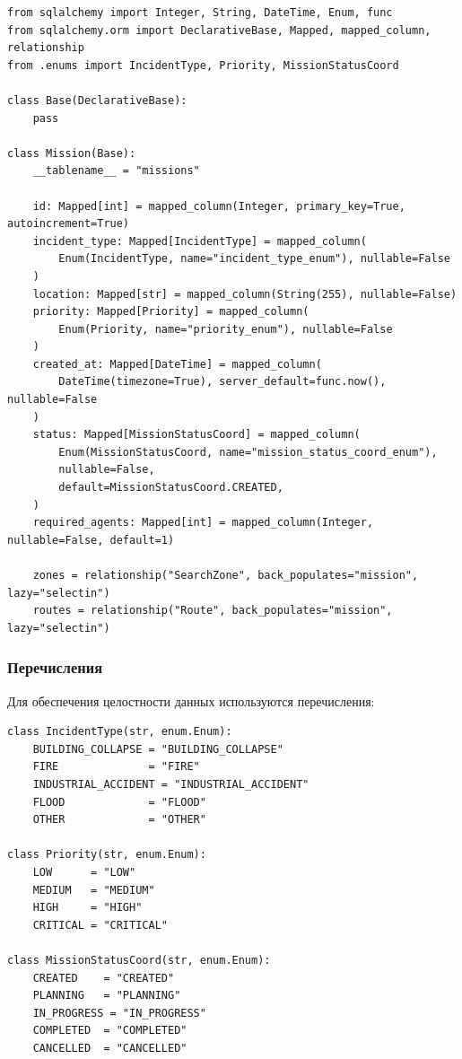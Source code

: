\documentclass[12pt,a4paper]{article}
\begin{document}
\begin{lstlisting}[caption={Модель миссии (coordination\_service/app/models/mission.py)}]
from sqlalchemy import Integer, String, DateTime, Enum, func
from sqlalchemy.orm import DeclarativeBase, Mapped, mapped_column, relationship
from .enums import IncidentType, Priority, MissionStatusCoord

class Base(DeclarativeBase):
    pass

class Mission(Base):
    __tablename__ = "missions"

    id: Mapped[int] = mapped_column(Integer, primary_key=True, autoincrement=True)
    incident_type: Mapped[IncidentType] = mapped_column(
        Enum(IncidentType, name="incident_type_enum"), nullable=False
    )
    location: Mapped[str] = mapped_column(String(255), nullable=False)
    priority: Mapped[Priority] = mapped_column(
        Enum(Priority, name="priority_enum"), nullable=False
    )
    created_at: Mapped[DateTime] = mapped_column(
        DateTime(timezone=True), server_default=func.now(), nullable=False
    )
    status: Mapped[MissionStatusCoord] = mapped_column(
        Enum(MissionStatusCoord, name="mission_status_coord_enum"),
        nullable=False,
        default=MissionStatusCoord.CREATED,
    )
    required_agents: Mapped[int] = mapped_column(Integer, nullable=False, default=1)

    zones = relationship("SearchZone", back_populates="mission", lazy="selectin")
    routes = relationship("Route", back_populates="mission", lazy="selectin")
\end{lstlisting}

\subsubsection{Перечисления}

Для обеспечения целостности данных используются перечисления:

\begin{lstlisting}[caption={Перечисления coordination\_service}]
class IncidentType(str, enum.Enum):
    BUILDING_COLLAPSE = "BUILDING_COLLAPSE"
    FIRE              = "FIRE"
    INDUSTRIAL_ACCIDENT = "INDUSTRIAL_ACCIDENT"
    FLOOD             = "FLOOD"
    OTHER             = "OTHER"

class Priority(str, enum.Enum):
    LOW      = "LOW"
    MEDIUM   = "MEDIUM"
    HIGH     = "HIGH"
    CRITICAL = "CRITICAL"

class MissionStatusCoord(str, enum.Enum):
    CREATED    = "CREATED"
    PLANNING   = "PLANNING"
    IN_PROGRESS = "IN_PROGRESS"
    COMPLETED  = "COMPLETED"
    CANCELLED  = "CANCELLED"
\end{lstlisting}
\end{document}
